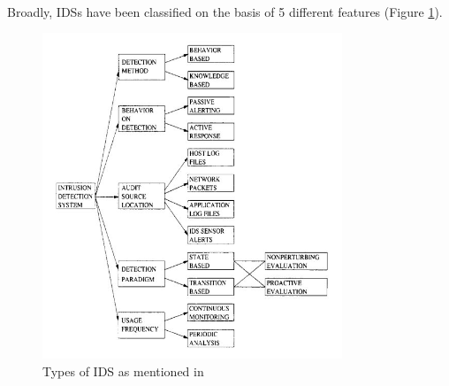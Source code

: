 \paragraph{}
Broadly, IDSs have been classified on the basis of 5 different features (Figure \ref{types_of_ids}).
\begin{figure}[h]
    \hfill\includegraphics[width=0.8\textwidth]{Chapter2/types_of_ids}\hspace*{\fill}
    \caption{Types of IDS as mentioned in \cite{ids_taxonomy}}
    \label{types_of_ids}
\end{figure}
